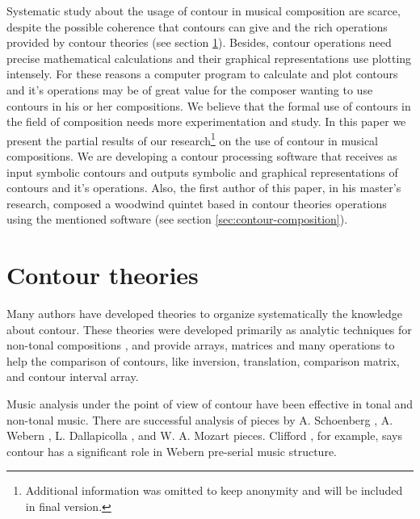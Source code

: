 Systematic study about the usage of contour in musical composition are
scarce, despite the possible coherence that contours can give and the
 rich
operations provided by contour theories (see section
\ref{sec:contour-theories}). Besides, contour operations need precise
mathematical calculations and their graphical representations use
plotting intensely. For these reasons a computer program to calculate
and plot contours and it's operations may be of great value for the
composer wanting to use contours in his or her compositions. We
believe that the formal use of contours in the field of composition
needs more experimentation and study. In this paper we present the
partial results of our research\footnote{Additional information was
  omitted to keep anonymity and will be included in final version.} on
the use of contour in musical compositions. We are developing a
contour processing software that receives as input symbolic contours
and outputs symbolic and graphical representations of contours and
it's operations. Also, the first author of this paper, in his master's
research, composed a woodwind quintet based in contour theories
operations using the mentioned software (see section
\ref{sec:contour-composition}).

\section{Contour theories}
\label{sec:contour-theories}

Many authors
\cite{friedmann85:methodology,friedmann87:response,morris87:composition,morris93:directions,marvin.ea87:relating,marvin88:generalized,marvin.ea95:generalization,polansky.ea92:possible,quinn97:fuzzy,clifford95:contour,beard03:contour}
have developed theories to organize systematically the knowledge about
contour. These theories were developed primarily as analytic
techniques for non-tonal compositions \cite{beard03:contour}, and
provide arrays, matrices and many operations to help the comparison of
contours, like inversion, translation, comparison matrix, and contour
interval array.

Music analysis under the point of view of contour have been effective
in tonal and non-tonal music. There are successful analysis of pieces
by A. Schoenberg \cite{friedmann85:methodology}, A. Webern
\cite{clifford95:contour}, L. Dallapicolla
\cite{marvin88:generalized}, and W. A. Mozart \cite{beard03:contour}
pieces. Clifford \cite{clifford95:contour}, for example, says contour
has a significant role in Webern pre-serial music structure.

